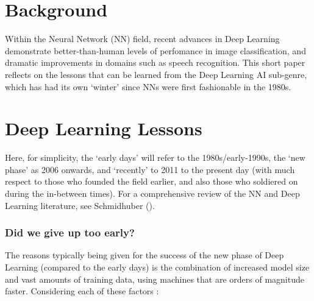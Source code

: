 \documentclass[citeauthoryear]{llncs}
\begin{document}
\section{Background}

Within the Neural Network (NN) field, 
recent advances in Deep Learning demonstrate better-than-human 
levels of perfomance in image classification, 
and dramatic improvements in domains such as speech recognition.  
This short paper reflects on the lessons that can be learned 
from the Deep Learning AI sub-genre, which has had its own `winter' 
since NNs were first fashionable in the 1980s.  

%
%
%

\section{Deep Learning Lessons}

Here, for simplicity, the `early days' will refer to the 1980s/early-1990s,
the `new phase' as 2006 onwards, and `recently' to 2011 to the present day
(with much respect to those who founded the field earlier, and also 
those who soldiered on during the in-between times).  
For a comprehensive review of the NN and Deep Learning literature, see Schmidhuber (\cite{SchmidhuberOverview}).
 

\subsubsection*{Did we give up too early?}
 
The reasons typically being given for the success of the new phase of Deep Learning 
(compared to the early days) is the combination of increased model size and 
vast amounts of training data, using machines that are orders of magnitude faster.  
Considering each of these factors :
\end{document}
